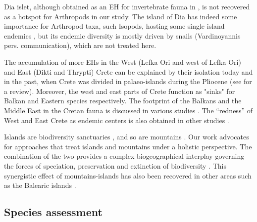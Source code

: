 Dia islet, although obtained as an EH for invertebrate fauna in \textcite{sfenthourakis2001hotspots},
is not recovered as a hotspot for Arthropods in our study.
The island of Dia has indeed some importance for Arthropod taxa, such Isopods,
hosting some single island endemics \parencite{schmalfuss2004the-terrestrial}, but its endemic
diversity is mostly driven by snails (Vardinoyannis pers. communication), which
are not treated here.

The accumulation of more EHs in the West (Lefka Ori and west of Lefka Ori) and
East (Dikti and Thrypti) Crete can be explained by their isolation today and in
the past, when Crete was divided in palaeo-islands during the Pliocene
(see \textcite{fassoulas2018,poulakakis2015a-review} for a review). Moreover, the
west and east parts of Crete function as "sinks" for Balkan and Eastern
species respectively. The footprint of the Balkans and the Middle East in the
Cretan fauna is discussed in various studies \parencite{chatzaki2003,trichas1996,trichas2020dispersal,vardinoyannis1994}.
The “redness” of West and East Crete as endemic centers is also obtained in
other studies \parencite{Assing_2019,kougioumoutzis2020plant}. 

Islands are biodiversity sanctuaries \parencite{whittaker2007island}, and
so are mountains \parencite{rahbek2019humboldts}. Our work advocates for approaches that
treat islands and mountains under a holistic perspective. The combination of
the two provides a complex biogeographical interplay governing the forces of
speciation, preservation and extinction of biodiversity \parencite{steinbauer2016topography-driven}.
This synergistic effect of mountains-islands has also been recovered in other
areas such as the Balearic islands \parencite{guardiola2023are-mediterranean}.

    \subsection{Species assessment}
    \label{subsec:arthropods-species-assessment-disc}

